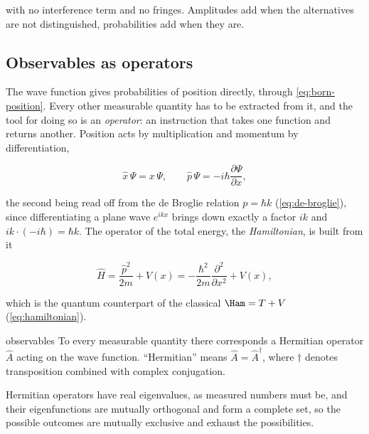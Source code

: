         with no interference term and no fringes. Amplitudes add when the alternatives are not distinguished, probabilities add when they are.

    \subsection{Observables as operators}

        The wave function gives probabilities of position directly, through \cref{eq:born-position}. Every other measurable quantity has to be extracted from it, and the tool for doing so is an \emph{operator}: an instruction that takes one function and returns another. Position acts by multiplication and momentum by differentiation,

        \begin{equation*}
            \hat{x}\,\Psi = x\,\Psi, \qquad
            \hat{p}\,\Psi = -i\hbar\frac{\partial \Psi}{\partial x},
        \end{equation*}

        the second being read off from the de Broglie relation $p = \hbar k$ (\cref{eq:de-broglie}), since differentiating a plane wave $e^{ikx}$ brings down exactly a factor $ik$ and $ik \cdot (-i\hbar)=\hbar k$. The operator of the total energy, the \emph{Hamiltonian}, is built from it

        \begin{equation*}
            \hat{H} = \frac{\hat{p}^{2}}{2m} + V(x) = -\frac{\hbar^{2}}{2m}\frac{\partial^{2}}{\partial x^{2}} + V(x),
        \end{equation*}

        which is the quantum counterpart of the classical $\Ham = T + V$ (\cref{eq:hamiltonian}).

        \begin{postulate}{observables}
            To every measurable quantity there corresponds a Hermitian operator $\hat{A}$ acting on the wave function. ``Hermitian'' means $\hat{A} = \hat{A}^{\dag}$, where $\dag$ denotes transposition combined with complex conjugation.
        \end{postulate}

        Hermitian operators have real eigenvalues, as measured numbers must be, and their eigenfunctions are mutually orthogonal and form a complete set, so the possible outcomes are mutually exclusive and exhaust the possibilities.

